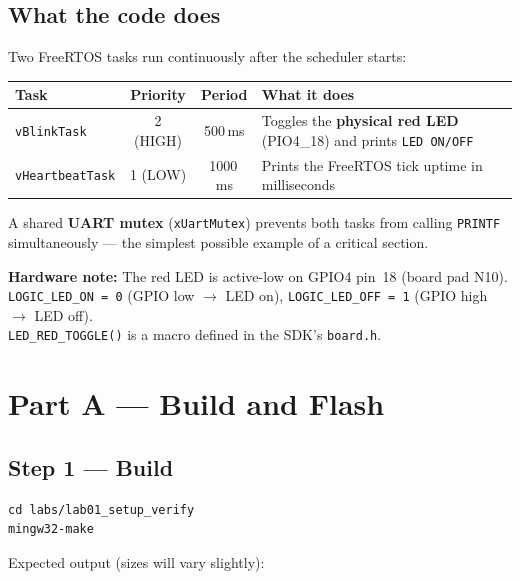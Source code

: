 \documentclass[11pt, a4paper]{article}
\newcommand{\file}[1]{\texttt{\small #1}}
\newcommand{\api}[1]{\texttt{\small #1}}
\begin{document}
\subsection{What the code does}

Two FreeRTOS tasks run continuously after the scheduler starts:

\renewcommand{\arraystretch}{1.3}
\begin{tabular}{@{} l c c p{6cm} @{}}
  \toprule
  \textbf{Task} & \textbf{Priority} & \textbf{Period} & \textbf{What it does} \\
  \midrule
  \texttt{vBlinkTask}     & 2 (HIGH) & 500\,ms  &
    Toggles the \textbf{physical red LED} (PIO4\_18) and prints \texttt{LED ON/OFF} \\
  \texttt{vHeartbeatTask} & 1 (LOW)  & 1000\,ms &
    Prints the FreeRTOS tick uptime in milliseconds \\
  \bottomrule
\end{tabular}
\renewcommand{\arraystretch}{1}

\medskip
A shared \textbf{UART mutex} (\api{xUartMutex}) prevents both tasks from calling
\api{PRINTF} simultaneously --- the simplest possible example of a critical section.

\begin{tipbox}
  \textbf{Hardware note:} The red LED is active-low on GPIO4 pin~18 (board pad N10).\\
  \texttt{LOGIC\_LED\_ON = 0} (GPIO low $\to$ LED on),
  \texttt{LOGIC\_LED\_OFF = 1} (GPIO high $\to$ LED off).\\
  \api{LED\_RED\_TOGGLE()} is a macro defined in the SDK's \file{board.h}.
\end{tipbox}

\section{Part A --- Build and Flash}

\subsection{Step 1 --- Build}

\begin{lstlisting}[style=bashstyle]
cd labs/lab01_setup_verify
mingw32-make
\end{lstlisting}

Expected output (sizes will vary slightly):
\end{document}
